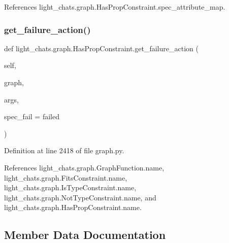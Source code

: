 References light\+\_\+chats.\+graph.\+Has\+Prop\+Constraint.\+spec\+\_\+attribute\+\_\+map.

\mbox{\label{classlight__chats_1_1graph_1_1HasPropConstraint_aff9fe175fee6b71e845e03433593814c}} 
\subsubsection{\texorpdfstring{get\+\_\+failure\+\_\+action()}{get\_failure\_action()}}
{\footnotesize\ttfamily def light\+\_\+chats.\+graph.\+Has\+Prop\+Constraint.\+get\+\_\+failure\+\_\+action (\begin{DoxyParamCaption}\item[{}]{self,  }\item[{}]{graph,  }\item[{}]{args,  }\item[{}]{spec\+\_\+fail = {\ttfamily \textquotesingle{}failed\textquotesingle{}} }\end{DoxyParamCaption})}



Definition at line 2418 of file graph.\+py.



References light\+\_\+chats.\+graph.\+Graph\+Function.\+name, light\+\_\+chats.\+graph.\+Fits\+Constraint.\+name, light\+\_\+chats.\+graph.\+Is\+Type\+Constraint.\+name, light\+\_\+chats.\+graph.\+Not\+Type\+Constraint.\+name, and light\+\_\+chats.\+graph.\+Has\+Prop\+Constraint.\+name.



\subsection{Member Data Documentation}
\mbox{\label{classlight__chats_1_1graph_1_1HasPropConstraint_a99d9e6127bf2ce7766f80d71e1a50818}} 
